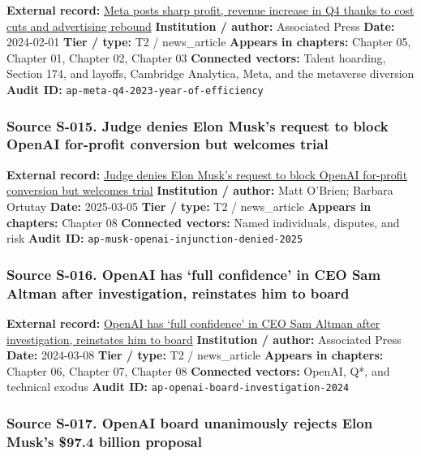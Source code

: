\documentclass[
  american,
  11pt,
  letterpaper,
]{article}
\begin{document}
\textbf{External record:}
\href{https://apnews.com/article/abc3e389d97fb97c661ccb6acfcf65c7}{Meta
posts sharp profit, revenue increase in Q4 thanks to cost cuts and
advertising rebound} \textbf{Institution / author:} Associated Press
\textbf{Date:} 2024-02-01 \textbf{Tier / type:} T2 / news\_article
\textbf{Appears in chapters:} Chapter 05, Chapter 01, Chapter 02,
Chapter 03 \textbf{Connected vectors:} Talent hoarding, Section 174, and
layoffs, Cambridge Analytica, Meta, and the metaverse diversion
\textbf{Audit ID:} \texttt{ap-meta-q4-2023-year-of-efficiency}

\subsubsection{Source S-015. Judge denies Elon Musk's request to block
OpenAI for-profit conversion but welcomes
trial}\label{source-s-015-judge-denies-elon-musk-s-request-to-block-openai-for-profit-conversion-but-welcomes-trial}

\textbf{External record:}
\href{https://apnews.com/article/elon-musk-openai-lawsuit-f5724e7ab07b5bed8292a1e8aa2ef695}{Judge
denies Elon Musk's request to block OpenAI for-profit conversion but
welcomes trial} \textbf{Institution / author:} Matt O'Brien; Barbara
Ortutay \textbf{Date:} 2025-03-05 \textbf{Tier / type:} T2 /
news\_article \textbf{Appears in chapters:} Chapter 08 \textbf{Connected
vectors:} Named individuals, disputes, and risk \textbf{Audit ID:}
\texttt{ap-musk-openai-injunction-denied-2025}

\subsubsection{Source S-016. OpenAI has `full confidence' in CEO Sam
Altman after investigation, reinstates him to
board}\label{source-s-016-openai-has-full-confidence-in-ceo-sam-altman-after-investigation-reinstates-him-to-board}

\textbf{External record:}
\href{https://apnews.com/article/2f3303dff2280478947e9bfb04863537}{OpenAI
has `full confidence' in CEO Sam Altman after investigation, reinstates
him to board} \textbf{Institution / author:} Associated Press
\textbf{Date:} 2024-03-08 \textbf{Tier / type:} T2 / news\_article
\textbf{Appears in chapters:} Chapter 06, Chapter 07, Chapter 08
\textbf{Connected vectors:} OpenAI, Q*, and technical exodus
\textbf{Audit ID:} \texttt{ap-openai-board-investigation-2024}

\subsubsection{Source S-017. OpenAI board unanimously rejects Elon
Musk's \$97.4 billion
proposal}\label{source-s-017-openai-board-unanimously-rejects-elon-musk-s-97-4-billion-proposal}
\end{document}
